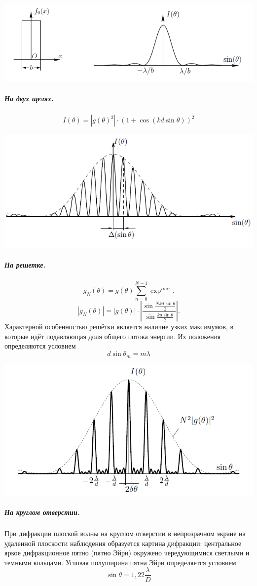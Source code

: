 \documentclass[12pt]{article}
\begin{document}
	\includegraphics{fraun_one}
	\subparagraph{На двух щелях.}
	$$I(\theta) = |g(\theta)^2|\cdot(1 + \cos(kd\sin \theta))^2$$
	\begin{center}
		
	\includegraphics{fraun_two}
	
\end{center}
	\subparagraph{На решетке.}
	$$g_N(\theta) = g(\theta)\sum_{n= 0}^{N-1}\exp^{im\alpha}.$$
	$$|g_N(\theta)| = |g(\theta)|\cdot \left|\dfrac{\sin\frac{Nkd\sin\theta}{2}}{\sin\frac{kd\sin\theta}{2}}\right|.$$
	Характерной особенностью решётки является наличие узких максимумов, в которые идёт подавляющая доля общего потока энергии. Их
	положения определяются условием
	$$d\sin\theta_m = m\lambda$$
	\begin{center}
	
	\includegraphics{fraun_resh}
	
\end{center}
	\subparagraph{На круглом отверстии.}
	При дифракции плоской волны на круглом отверстии в непрозрачном экране на удаленной плоскости наблюдения образуется картина дифракции: центральное яркое дифракционное пятно (пятно Эйри) окружено чередующимися светлыми и темными кольцами. Угловая полуширина пятна Эйри определяется условием $$\sin \theta = 1,22 \dfrac{\lambda }{D}$$
	
\end{document}

